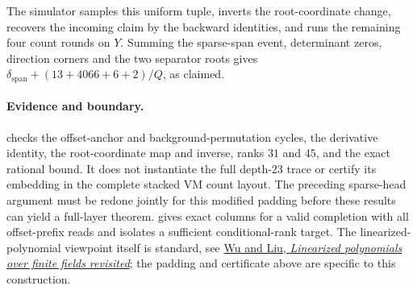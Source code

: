 The simulator samples this uniform tuple, inverts the root-coordinate change, recovers the incoming claim by the backward identities, and runs the remaining four count rounds on $Y$. Summing the sparse-span event, determinant zeros, direction corners and the two separator roots gives $\delta_{\mathrm{span}}+(13+4066+6+2)/Q$, as claimed.

\paragraph{Evidence and boundary.}  checks the offset-anchor and background-permutation cycles, the derivative identity, the root-coordinate map and inverse, ranks $31$ and $45$, and the exact rational bound. It does not instantiate the full depth-$23$ trace or certify its embedding in the complete stacked VM count layout. The preceding sparse-head argument must be redone jointly for this modified padding before these results can yield a full-layer theorem.  gives exact columns for a valid completion with all offset-prefix reads and isolates a sufficient conditional-rank target. The linearized-polynomial viewpoint itself is standard, see \href{https://arxiv.org/abs/1211.5475}{Wu and Liu, \emph{Linearized polynomials over finite fields revisited}}; the padding and certificate above are specific to this construction.
